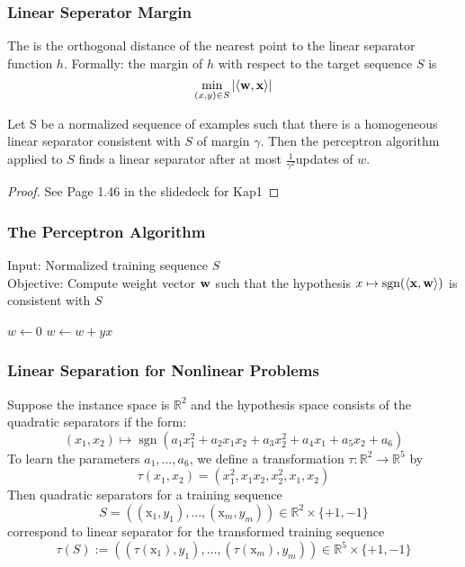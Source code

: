 \subsubsection{Linear Seperator Margin}
The  is the orthogonal distance of the nearest point to the linear separator function $h$. Formally: the margin of $h$ with respect to the target sequence $S$ is
\begin{equation}
\min_{(x, y) \in S}|\langle\mathbf{w}, \mathbf{x}\rangle|
\end{equation} 
\begin{theorem}{}
	Let S  be a normalized sequence of examples such that there is a homogeneous linear separator consistent with $S$ of margin $\gamma$. Then the perceptron algorithm applied to $S$ finds a linear separator after at most $\frac{1}{\gamma^2}$updates of $w$.
\end{theorem}
\begin{proof}{}
	See Page 1.46 in the slidedeck for Kap1
\end{proof}
\subsubsection{The Perceptron Algorithm}
Input: Normalized training sequence $S$\\
Objective: Compute weight vector $\mathbf{w}$ such that the hypothesis $x \mapsto \operatorname{sgn}(\langle\mathbf{x},\mathbf{w}\rangle)$ is consistent with $S$

\begin{algorithmic}
	\State $w\gets 0$
	\Repeat 
			\State $w \gets w + yx$
		\EndIf
		\EndFor
\end{algorithmic}
\subsubsection{Linear Separation for Nonlinear Problems}
Suppose the instance space is $\mathbb{R}^2$ and the hypothesis space consists of the quadratic separators if the form:
\begin{equation}
(x_1, x_2) \mapsto \operatorname{sgn}(a_1 x_1^2+a_2 x_1 x_2+a_3 x_2^2+a_4 x_1+a_5 x_2+a_6)
\end{equation}
To learn the parameters $a_1,\ldots,a_6$, we define a transformation $\tau :\mathbb{R}^2 \rightarrow \mathbb{R}^5$ by
\begin{equation}
\tau(x_1,x_2) = (x_1^2,x_1x_2,x_2^2,x_1,x_2)
\end{equation}
Then quadratic separators for a training sequence
\begin{equation}
S=((\mathrm{x}_{1}, y_{1}), \ldots,(\mathrm{x}_{m}, y_{m})) \in \mathbb{R}^{2} \times\{+1,-1\}
\end{equation}
correspond to linear separator for the transformed training sequence
\begin{equation}
\tau(S) :=((\tau(\mathrm{x}_{1}), y_{1}), \ldots,(\tau(\mathrm{x}_{m}), y_{m})) \in \mathbb{R}^{5} \times\{+1,-1\}
\end{equation}
